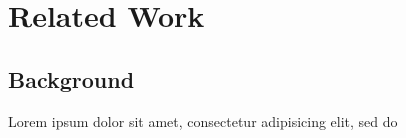 \chapter{Related Work}


\section{Background}

Lorem ipsum dolor sit amet, consectetur adipisicing elit, sed do



